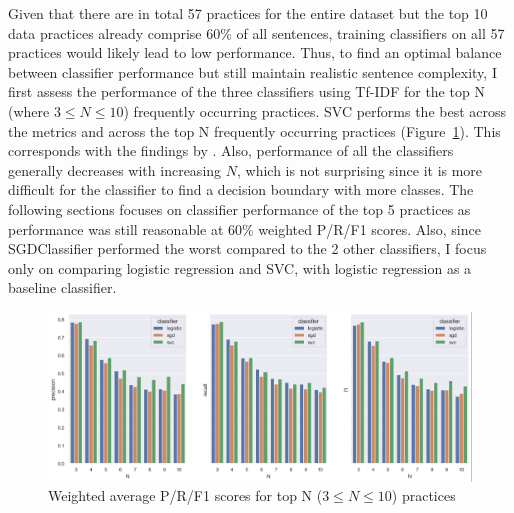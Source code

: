 Given that there are in total 57 practices for the entire dataset but the top 10 data practices already comprise 60\% of all sentences, training classifiers on all 57 practices would likely lead to low performance. Thus, to find an optimal balance between classifier performance but still maintain realistic sentence complexity, I first assess the performance of the three classifiers using Tf-IDF for the top N (where $3 \le N \le 10$) frequently occurring practices. SVC performs the best across the metrics and across the top N frequently occurring practices (Figure~\ref{fig:top_n_practices}). This corresponds with the findings by \cite{zimmeck2019}. Also, performance of all the classifiers generally decreases with increasing $N$, which is not surprising since it is more difficult for the classifier to find a decision boundary with more classes. The following sections focuses on classifier performance of the top 5 practices as performance was still reasonable at 60\% weighted P/R/F1 scores. Also, since SGDClassifier performed the worst compared to the 2 other classifiers, I focus only on comparing logistic regression and SVC, with logistic regression as a baseline classifier.

\begin{figure}[!ht]
	\centering
	\includegraphics[width=1\textwidth]{figures/model_n_testing_sentence.png}      
    \caption{Weighted average P/R/F1 scores for top N ($3 \le N \le 10$) practices}
    \label{fig:top_n_practices}
\end{figure}

